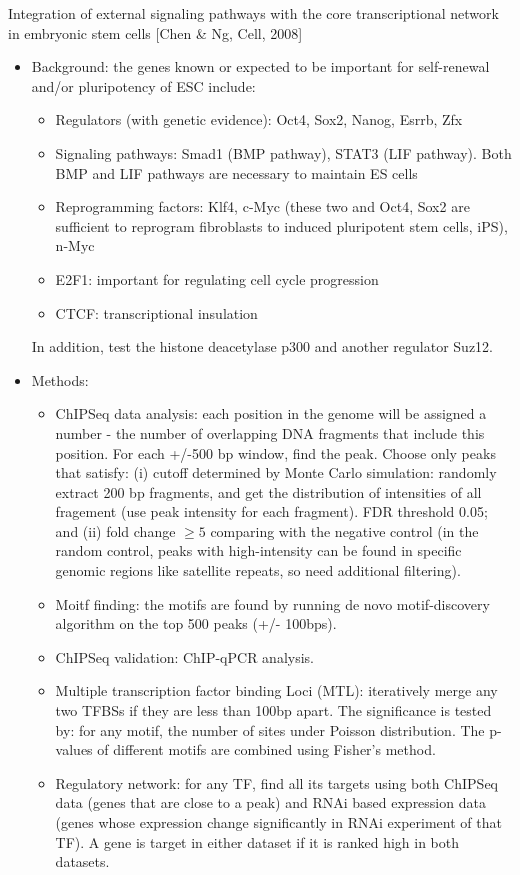 \documentclass{report}
\begin{document}
Integration of external signaling pathways with the core transcriptional network in embryonic stem cells [Chen \& Ng, Cell, 2008]
\begin{itemize}
	\item Background: the genes known or expected to be important for self-renewal and/or pluripotency of ESC include: 
	\begin{itemize}
		\item Regulators (with genetic evidence): Oct4, Sox2, Nanog, Esrrb, Zfx
		\item Signaling pathways: Smad1 (BMP pathway), STAT3 (LIF pathway). Both BMP and LIF pathways are necessary to maintain ES cells
		\item Reprogramming factors: Klf4, c-Myc (these two and Oct4, Sox2 are sufficient to reprogram fibroblasts to induced pluripotent stem cells, iPS), n-Myc
		\item E2F1: important for regulating cell cycle progression
		\item CTCF: transcriptional insulation
	\end{itemize}
	In addition, test the histone deacetylase p300 and another regulator Suz12.  
	
	\item Methods:
	\begin{itemize}
		\item ChIPSeq data analysis: each position in the genome will be assigned a number - the number of overlapping DNA fragments that include this position. For each +/-500 bp window, find the peak. Choose only peaks that satisfy: (i) cutoff determined by Monte Carlo simulation: randomly extract 200 bp fragments, and get the distribution of intensities of all fragement (use peak intensity for each fragment). FDR threshold 0.05; and (ii) fold change $\geq 5$ comparing with the negative control (in the random control, peaks with high-intensity can be found in specific genomic regions like satellite repeats, so need additional filtering). 
		\item Moitf finding: the motifs are found by running de novo motif-discovery algorithm on the top 500 peaks (+/- 100bps). 
		\item ChIPSeq validation: ChIP-qPCR analysis. 
		\item Multiple transcription factor binding Loci (MTL): iteratively merge any two TFBSs if they are less than 100bp apart. The significance is tested by: for any motif, the number of sites under Poisson distribution. The p-values of different motifs are combined using Fisher's method. 
		\item Regulatory network: for any TF, find all its targets using both ChIPSeq data (genes that are close to a peak) and RNAi based expression data (genes whose expression change significantly in RNAi experiment of that TF). A gene is target in either dataset if it is ranked high in both datasets. 
	\end{itemize}
	

\end{itemize}
\end{document}

